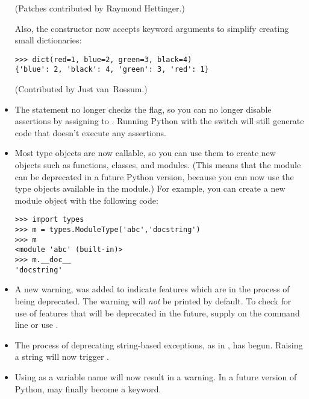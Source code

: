 \documentclass{howto}
\begin{document}
\begin{itemize}
(Patches contributed by Raymond Hettinger.)

Also, the  constructor now accepts keyword arguments to
simplify creating small dictionaries:

\begin{verbatim}
>>> dict(red=1, blue=2, green=3, black=4)
{'blue': 2, 'black': 4, 'green': 3, 'red': 1}    
\end{verbatim}

(Contributed by Just van~Rossum.)       

\item The  statement no longer checks the 
flag, so you can no longer disable assertions by assigning to .
Running Python with the  switch will still generate
code that doesn't execute any assertions.

\item Most type objects are now callable, so you can use them
to create new objects such as functions, classes, and modules.  (This
means that the  module can be deprecated in a future
Python version, because you can now use the type objects available in
the  module.)
For example, you can create a new module object with the following code:

\begin{verbatim}
>>> import types
>>> m = types.ModuleType('abc','docstring')
>>> m
<module 'abc' (built-in)>
>>> m.__doc__
'docstring'
\end{verbatim}

\item
A new warning,  was added to
indicate features which are in the process of being
deprecated.  The warning will \emph{not} be printed by default.  To
check for use of features that will be deprecated in the future,
supply  on the
command line or use .

\item The process of deprecating string-based exceptions, as
in , has begun.  Raising a string will
now trigger .

\item Using  as a variable name will now result in a
 warning.  In a future version of Python,
 may finally become a keyword.


\end{itemize}
\end{document}
